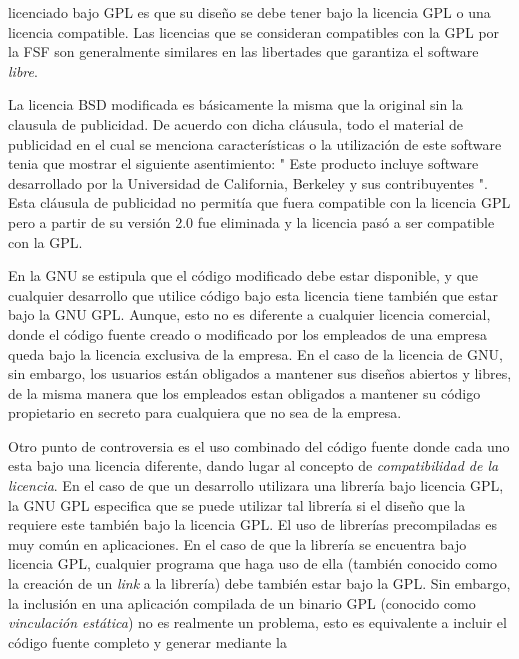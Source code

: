	licenciado bajo GPL es que su diseño se debe tener bajo la licencia  GPL o una licencia compatible. Las licencias que se consideran compatibles con
	la GPL por la FSF son generalmente similares en las libertades que garantiza el software \textit{libre}.
	\vspace{0.5cm}
	\par	
	La licencia BSD modificada es básicamente la misma que la original sin la clausula de publicidad. De acuerdo con dicha cláusula, todo el material de
	publicidad en el cual se menciona características o la utilización de este software tenia que mostrar el siguiente asentimiento: " Este producto
	incluye software desarrollado por la Universidad de California, Berkeley y sus contribuyentes ". Esta cláusula de publicidad no permitía que fuera
	compatible con la licencia GPL pero a partir de su versión 2.0 fue eliminada y la licencia pasó a ser compatible con la GPL.
	\vspace{0.5cm}
	\par	
	En la GNU se estipula que el código modificado debe estar disponible, y que cualquier desarrollo que utilice código bajo esta licencia tiene también
	que estar bajo la GNU GPL. Aunque, esto no es diferente a cualquier licencia comercial, donde el código fuente creado o modificado por los empleados
	de una empresa queda bajo la licencia exclusiva de la empresa. En el caso de la licencia de GNU, sin embargo, los usuarios están obligados a mantener
	sus diseños abiertos y libres, de la misma manera que los empleados estan obligados a mantener su código propietario en secreto para cualquiera que
	no sea de la empresa.
	\vspace{0.5cm}
	\par	
	Otro punto de controversia es el uso combinado del código fuente donde cada uno esta bajo una licencia diferente, dando lugar al concepto de
	\textit{compatibilidad de la licencia}. En el caso de que un desarrollo utilizara una librería bajo licencia GPL, la GNU GPL especifica que se puede
	utilizar tal librería si el diseño que la requiere este también bajo la licencia GPL. El uso de librerías precompiladas es muy común en aplicaciones.
	En el caso de que la librería se encuentra bajo licencia GPL, cualquier programa que haga uso de ella (también conocido como la creación de un
	\textit{link} a la librería) debe también estar bajo la GPL. Sin embargo, la inclusión en una aplicación compilada de un binario GPL (conocido como
	\textit{vinculación estática}) no es realmente un problema, esto es equivalente a incluir el código fuente completo y generar mediante la
